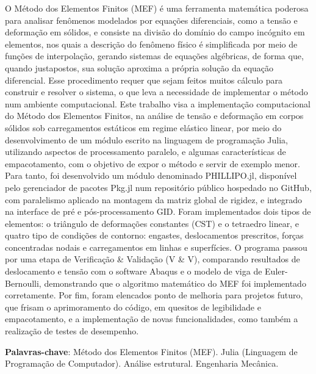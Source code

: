 
\setlength{\absparsep}{18pt} %
\begin{resumo}
    O Método dos Elementos Finitos (MEF) é uma ferramenta matemática poderosa para analisar fenômenos modelados por equações diferenciais, como a tensão e deformação em sólidos, e consiste na divisão do domínio do campo incógnito em elementos, nos quais a descrição do fenômeno físico é simplificada por meio de funções de interpolação, gerando sistemas de equações algébricas, de forma que, quando justapostos, sua solução aproxima a própria solução da equação diferencial. Esse procedimento requer que sejam feitos muitos cálculo para construir e resolver o sistema, o que leva a necessidade de implementar o método num ambiente computacional. Este trabalho visa a implementação computacional do Método dos Elementos Finitos, na análise de tensão e deformação em corpos sólidos sob carregamentos estáticos em regime elástico linear, por meio do desenvolvimento de um módulo escrito na linguagem de programação Julia, utilizando aspectos de processamento paralelo, e algumas características de empacotamento, com o objetivo de expor o método e servir de exemplo menor. Para tanto, foi desenvolvido um módulo denominado PHILLIPO.jl, disponível pelo gerenciador de pacotes Pkg.jl num repositório público hospedado no GitHub, com paralelismo aplicado na montagem da matriz global de rigidez, e integrado na interface de pré e pós-processamento GID. Foram implementados dois tipos de elementos: o triângulo de deformações constantes (CST) e o tetraedro linear, e quatro tipo de condições de contorno: engastes, deslocamentos prescritos, forças concentradas nodais e carregamentos em linhas e superfícies. O programa passou por uma etapa de Verificação \& Validação (V \& V), comparando resultados de deslocamento e tensão com o software Abaqus e o modelo de viga de Euler-Bernoulli, demonstrando que o algoritmo matemático do MEF foi implementado corretamente. Por fim, foram elencados ponto de melhoria para projetos futuro, que frisam o aprimoramento do código, em quesitos de legibilidade e empacotamento, e a implementação de novas funcionalidades, como também a realização de testes de desempenho.


    \textbf{Palavras-chave}: Método dos Elementos Finitos (MEF). Julia (Linguagem de Programação de Computador). Análise estrutural. Engenharia Mecânica.

\end{resumo}
